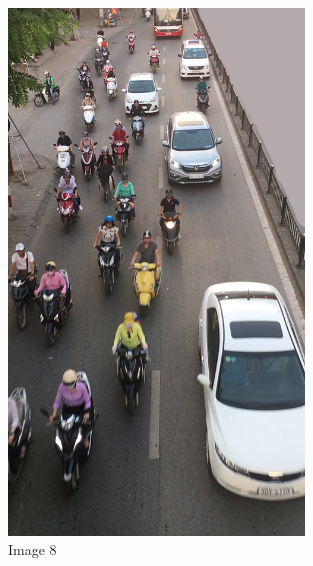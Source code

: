 \begin{center}
    \begin{figure}[H]
        \centering
      \includegraphics[width=0.7\textwidth]{Chapters/Fig/08}
      \caption{Image 8}
      \label{fig:img08}
  \end{figure}
\end{center}

